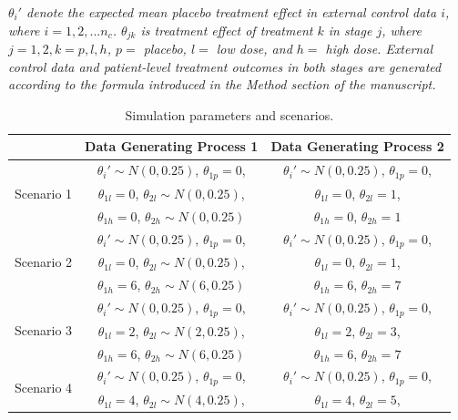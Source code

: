 \begin{table}
\caption{Simulation parameters and scenarios. \label{tab:scenarios}}
\begin{center}
\vspace{-5mm}
\begin{tablenotes}  
    \small
     \textit{$\theta_{i}'$ denote the expected mean placebo treatment effect in external control data $i$, where $i = 1,2,...n_c$. $\theta_{jk}$ is treatment effect of treatment $k$ in stage $j$, where $j = 1,2, k = p,l,h$, $p = $ placebo, $l = $ low dose, and $h = $ high dose. External control data and patient-level treatment outcomes in both stages are generated according to the formula introduced in the Method section of the manuscript. }\\
     \vspace{2.5mm}
\end{tablenotes}
\begin{tabular}{ccc}
  &  Data Generating Process 1 &  Data Generating Process 2 \tabularnewline
\hline
\multirow{3}{4.5em}{Scenario 1} & $\theta_i' \sim N(0, 0.25)$, $\theta_{1p} = 0$, & $\theta_i' \sim N(0, 0.25)$, $\theta_{1p} = 0$,\\
 & $\theta_{1l} = 0$, $\theta_{2l} \sim N(0, 0.25)$, & $\theta_{1l} = 0$, $\theta_{2l} = 1$, \\
 & $\theta_{1h} = 0$,  $\theta_{2h} \sim N(0, 0.25)$ & $\theta_{1h} = 0$, $\theta_{2h} = 1$\\  
\hline
\multirow{3}{4.5em}{Scenario 2} & $\theta_i' \sim N(0, 0.25)$, $\theta_{1p} = 0$, & $\theta_i' \sim N(0, 0.25)$, $\theta_{1p} = 0$,\\
 & $\theta_{1l} = 0$, $\theta_{2l} \sim N(0, 0.25)$, & $\theta_{1l} = 0$, $\theta_{2l} = 1$, \\
 & $\theta_{1h} = 6$,  $\theta_{2h} \sim N(6, 0.25)$ & $\theta_{1h} = 6$, $\theta_{2h} = 7$\\  
\hline
\multirow{3}{4.5em}{Scenario 3} & $\theta_i' \sim N(0, 0.25)$, $\theta_{1p} = 0$, & $\theta_i' \sim N(0, 0.25)$, $\theta_{1p} = 0$,\\
 & $\theta_{1l} = 2$, $\theta_{2l} \sim N(2, 0.25)$, & $\theta_{1l} = 2$, $\theta_{2l} = 3$, \\
 & $\theta_{1h} = 6$,  $\theta_{2h} \sim N(6, 0.25)$ & $\theta_{1h} = 6$, $\theta_{2h} = 7$\\  
\hline
\multirow{3}{4.5em}{Scenario 4} & $\theta_i' \sim N(0, 0.25)$, $\theta_{1p} = 0$, & $\theta_i' \sim N(0, 0.25)$, $\theta_{1p} = 0$,\\
 & $\theta_{1l} = 4$, $\theta_{2l} \sim N(4, 0.25)$, & $\theta_{1l} = 4$, $\theta_{2l} = 5$, \\

\end{tabular}
\end{center}
\end{table}
